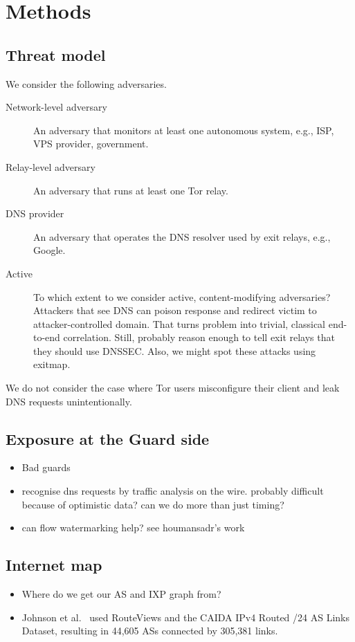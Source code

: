 \section{Methods}
\label{sec:methods}

\subsection{Threat model}
We consider the following adversaries.
\begin{description}
	\item[Network-level adversary] An adversary that monitors at least
		one autonomous system, e.g., ISP, VPS provider, government.
	\item[Relay-level adversary] An adversary that runs at least one Tor relay.
	\item[DNS provider] An adversary that operates the DNS resolver used
		by exit relays, e.g., Google.
	\item[Active] To which extent to we consider active, content-modifying
		adversaries?  Attackers that see DNS can poison response and redirect
		victim to attacker-controlled domain.  That turns problem into trivial,
		classical end-to-end correlation.  Still, probably reason enough to tell
		exit relays that they should use DNSSEC.  Also, we might spot these
		attacks using exitmap.
\end{description}

We do not consider the case where Tor users misconfigure their client and leak
DNS requests unintentionally.

\subsection{Exposure at the Guard side}
\begin{itemize}
	\item Bad guards
	\item recognise dns requests by traffic analysis on the wire.  probably
		difficult because of optimistic data?  can we do more than just timing?
	\item can flow watermarking help?  see houmansadr's
		work~\cite{Houmansadr2011a}
\end{itemize}

\subsection{Internet map}
\begin{itemize}
	\item Where do we get our AS and IXP graph from?
	\item Johnson et al.~\cite[\S 5.2]{Johnson2013a} used RouteViews and the CAIDA IPv4
		Routed /24 AS Links Dataset, resulting in 44,605 ASs connected by
		305,381 links.
\end{itemize}

